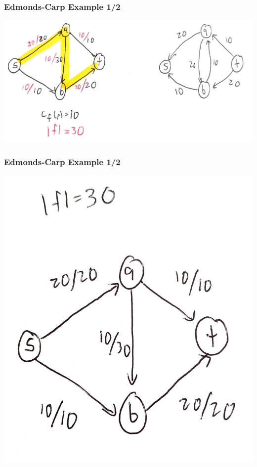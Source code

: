 \documentclass[10pt,aspectratio=169]{beamer}
\begin{document}
\begin{frame} \frametitle{Edmonds-Carp Example 1/2}
\begin{center}
  \includegraphics[scale=.12]{ek-1-4.jpg}
\end{center}
\end{frame}

\begin{frame} \frametitle{Edmonds-Carp Example 1/2}
\begin{center}
  \includegraphics[scale=.12]{ek-1-5.jpg}
\end{center}
\end{frame}
\end{document}
